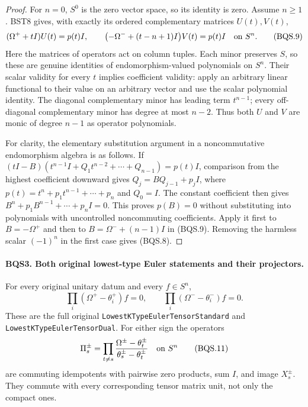 \begin{proof}
For $n=0$, $S^0$ is the zero vector space, so its identity is zero.
Assume $n\ge1$.  BST8 gives, with exactly its ordered complementary
matrices $U(t),V(t)$,
\[
 (\Omega^++tI)U(t)=p(t)I,\qquad
 \bigl(-\Omega^-+(t-n+1)I\bigr)V(t)=p(t)I
 \quad\hbox{on }S^n.
 \tag{BQS.9}
\]
Here the matrices of operators act on column tuples.  Each minor
preserves $S$, so these are genuine identities of endomorphism-valued
polynomials on $S^n$.  Their scalar validity for every $t$ implies
coefficient validity: apply an arbitrary linear functional to their
value on an arbitrary vector and use the scalar polynomial identity.
The diagonal complementary minor has leading term $t^{n-1}$; every
off-diagonal complementary minor has degree at most $n-2$.  Thus both
$U$ and $V$ are monic of degree $n-1$ as operator polynomials.

For clarity, the elementary substitution argument in a noncommutative
endomorphism algebra is as follows.  If
$(tI-B)(t^{n-1}I+Q_1t^{n-2}+\cdots+Q_{n-1})=p(t)I$,
comparison from the highest coefficient downward gives
$Q_j=BQ_{j-1}+p_jI$, where
$p(t)=t^n+p_1t^{n-1}+\cdots+p_n$ and $Q_0=I$.
The constant coefficient then gives
$B^n+p_1B^{n-1}+\cdots+p_nI=0$.
This proves $p(B)=0$ without substituting into polynomials with
uncontrolled noncommuting coefficients.
Apply it first to $B=-\Omega^+$ and then to
$B=\Omega^-+(n-1)I$ in (BQS.9).
Removing the harmless scalar $(-1)^n$ in the first case gives (BQS.8).
\end{proof}

\paragraph{BQS3. Both original lowest-type Euler statements and their projectors.}
\label{claim:BQS3}
For every original unitary datum and every $f\in S^n$,
\[
 \prod_i(\Omega^+-\theta_i^+)f=0,\qquad
 \prod_i(\Omega^--\theta_i^-)f=0.
 \tag{BQS.10}
\]
These are the full original \texttt{LowestKTypeEuler\allowbreak{}TensorStandard}
and \texttt{LowestKTypeEuler\allowbreak{}TensorDual}.  For either sign the operators
\[
 \Pi_s^\pm=
 \prod_{t\ne s}\frac{\Omega^\pm-\theta_t^\pm}
                       {\theta_s^\pm-\theta_t^\pm}
 \quad\hbox{on }S^n
 \tag{BQS.11}
\]
are commuting idempotents with pairwise zero products, sum $I$, and
image $X_s^\pm$.  They commute with every corresponding tensor matrix
unit, not only the compact ones.

